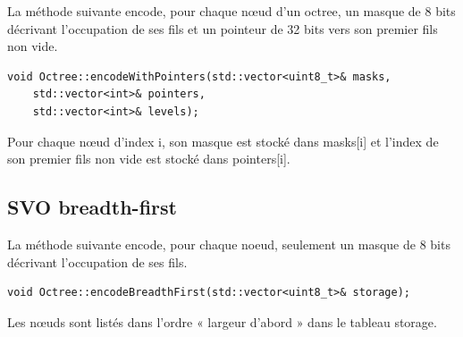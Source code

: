 \documentclass[a4paper]{article}
\begin{document}
La méthode suivante encode, pour chaque nœud d'un octree, un masque de 8 bits décrivant l’occupation de ses fils et un pointeur de 32 bits vers son premier fils non vide. 

\begin{lstlisting}
void Octree::encodeWithPointers(std::vector<uint8_t>& masks, 
	std::vector<int>& pointers, 
	std::vector<int>& levels);
\end{lstlisting}

Pour chaque nœud d'index i, son masque est stocké dans masks[i] et l’index de son premier fils non vide est stocké dans pointers[i].

\subsection{SVO breadth-first}

La méthode suivante encode, pour chaque noeud, seulement un masque de 8 bits décrivant l’occupation de ses fils.

\begin{lstlisting}
void Octree::encodeBreadthFirst(std::vector<uint8_t>& storage);
\end{lstlisting}
 
Les nœuds sont listés dans l’ordre « largeur d’abord » dans le tableau storage.
\end{document}
